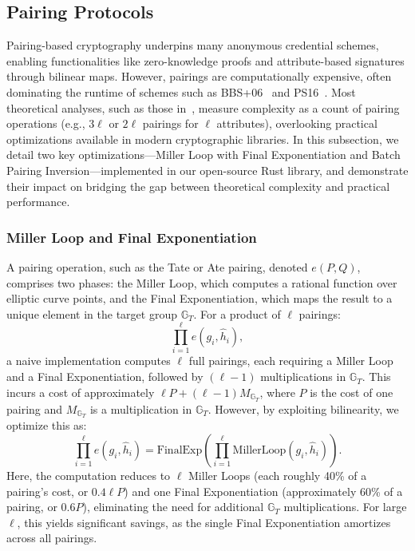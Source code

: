 \subsection{Pairing Protocols}

Pairing-based cryptography underpins many anonymous credential schemes, enabling functionalities like zero-knowledge proofs and attribute-based signatures through bilinear maps. However, pairings are computationally expensive, often dominating the runtime of schemes such as BBS+06~\cite{hutchison_constant-size_2006} and PS16~\cite{sako_short_2016}. Most theoretical analyses, such as those in~\cite{sako_short_2016}, measure complexity as a count of pairing operations (e.g., $3\ell$ or $2\ell$ pairings for $\ell$ attributes), overlooking practical optimizations available in modern cryptographic libraries. In this subsection, we detail two key optimizations—Miller Loop with Final Exponentiation and Batch Pairing Inversion—implemented in our open-source Rust library, and demonstrate their impact on bridging the gap between theoretical complexity and practical performance.

\subsubsection*{Miller Loop and Final Exponentiation}
A pairing operation, such as the Tate or Ate pairing, denoted $e(P, Q)$, comprises two phases: the Miller Loop, which computes a rational function over elliptic curve points, and the Final Exponentiation, which maps the result to a unique element in the target group $\mathbb{G}_T$. For a product of $\ell$ pairings:
\[
\prod_{i=1}^\ell e(g_i, \hat{h}_i),
\]
a naive implementation computes $\ell$ full pairings, each requiring a Miller Loop and a Final Exponentiation, followed by $(\ell-1)$ multiplications in $\mathbb{G}_T$. This incurs a cost of approximately $\ell P + (\ell-1)M_{\mathbb{G}_T}$, where $P$ is the cost of one pairing and $M_{\mathbb{G}_T}$ is a multiplication in $\mathbb{G}_T$. However, by exploiting bilinearity, we optimize this as:
\[
\prod_{i=1}^\ell e(g_i, \hat{h}_i) = \text{FinalExp}\left( \prod_{i=1}^\ell \text{MillerLoop}(g_i, \hat{h}_i) \right).
\]
Here, the computation reduces to $\ell$ Miller Loops (each roughly 40\% of a pairing’s cost, or $0.4\ell P$) and one Final Exponentiation (approximately 60\% of a pairing, or $0.6P$), eliminating the need for additional $\mathbb{G}_T$ multiplications. For large $\ell$, this yields significant savings, as the single Final Exponentiation amortizes across all pairings.


